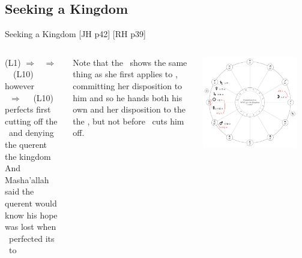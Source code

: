 \subsection{Seeking a Kingdom}
\begin{frame}[t]{Seeking a Kingdom [JH p42] [RH p39]}
\begin{columns}[T, onlytextwidth]
\Mercury\Retrograde (L1) $\Rightarrow$ \Conjunction\Sun\ $\Rightarrow$ \Sextile\ \Saturn\ (L10) \\
however \\
\Mars\ $\Rightarrow$ \Square\ \Saturn\ (L10) perfects first \\
cutting off the \Sun\ and denying the querent the kingdom \\
\vspace{0.25cm}
And Masha'allah said the querent would know his hope was lost when \Mars\ perfected its \Square\ to \Saturn \\
\vspace{0.25cm}

Note that the \Moon\ shows the same thing as she first applies to \Mercury, committing her disposition to him and so he hands both his own and her disposition to the the \Sun, but not before \Mars\ cuts him off.\\


\begin{center}
{\includegraphics[width=0.9\textwidth]{charts/50-chart-kingdom}} \\
\end{center}
\end{columns}
\end{frame}

